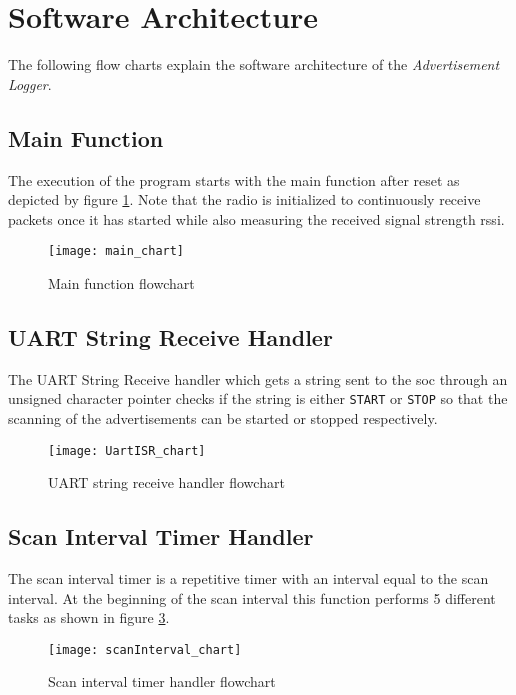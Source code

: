 \section{Software Architecture}
The following flow charts explain the software architecture of the \emph{Advertisement Logger}.
\subsection{Main Function}
The execution of the program starts with the main function after reset as depicted by figure \ref{fig:main_chart}. Note that the radio is initialized to continuously receive packets once it has started while also measuring the received signal strength \acrshort{rssi}.
\begin{figure}[h]
\centering
\vspace{80pt}
\texttt{[image: main\_chart]}
\caption{Main function flowchart}
\vspace{80pt}
\label{fig:main_chart}
\end{figure}
\clearpage

\subsection{UART String Receive Handler}
The UART String Receive handler which gets a string sent to the \gls{soc} through an unsigned character pointer checks if the string is either \texttt{START} or \texttt{STOP} so that the scanning of the advertisements can be started or stopped respectively.
\begin{figure}[h]
\centering
\vspace{50pt}
\texttt{[image: UartISR\_chart]}
\caption{UART string receive handler flowchart}
\vspace{51pt}
\label{fig:UartISR_chart}
\end{figure}
\clearpage

\subsection{Scan Interval Timer Handler}
The scan interval timer is a repetitive timer with an interval equal to the scan interval. At the beginning of the scan interval this function performs 5 different tasks as shown in figure \ref{fig:scanInterval_chart}.
\begin{figure}[h]
\centering
\vspace{20pt}
\texttt{[image: scanInterval\_chart]}
\caption{Scan interval timer handler flowchart}
\label{fig:scanInterval_chart}
\end{figure}

